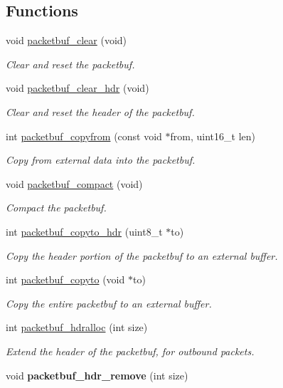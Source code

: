 \subsection*{Functions}
\begin{DoxyCompactItemize}
\item 
void \hyperlink{group__packetbuf_gaa540c9abf0db13d27881b616f7794824}{packetbuf\+\_\+clear} (void)
\begin{DoxyCompactList}\small\item\em Clear and reset the packetbuf. \end{DoxyCompactList}\item 
void \hyperlink{group__packetbuf_ga9ed85aa3405fa87ed8b1e523dd374dcd}{packetbuf\+\_\+clear\+\_\+hdr} (void)
\begin{DoxyCompactList}\small\item\em Clear and reset the header of the packetbuf. \end{DoxyCompactList}\item 
int \hyperlink{group__packetbuf_ga5fd9cb98f800733b6d9381bce81cd224}{packetbuf\+\_\+copyfrom} (const void $\ast$from, uint16\+\_\+t len)
\begin{DoxyCompactList}\small\item\em Copy from external data into the packetbuf. \end{DoxyCompactList}\item 
void \hyperlink{group__packetbuf_ga39a862c119717560e224923801c1fa2a}{packetbuf\+\_\+compact} (void)
\begin{DoxyCompactList}\small\item\em Compact the packetbuf. \end{DoxyCompactList}\item 
int \hyperlink{group__packetbuf_gac4b6f4ff134a21b6c2f726ca9342bb2f}{packetbuf\+\_\+copyto\+\_\+hdr} (uint8\+\_\+t $\ast$to)
\begin{DoxyCompactList}\small\item\em Copy the header portion of the packetbuf to an external buffer. \end{DoxyCompactList}\item 
int \hyperlink{group__packetbuf_gacad3b92ca8f9ce7845b6c490ba9f05bf}{packetbuf\+\_\+copyto} (void $\ast$to)
\begin{DoxyCompactList}\small\item\em Copy the entire packetbuf to an external buffer. \end{DoxyCompactList}\item 
int \hyperlink{group__packetbuf_gacffe7341cbfe90034e829ea70111203a}{packetbuf\+\_\+hdralloc} (int size)
\begin{DoxyCompactList}\small\item\em Extend the header of the packetbuf, for outbound packets. \end{DoxyCompactList}\item 
\hypertarget{group__packetbuf_ga4b2940aecccd22785e0160684c3a8327}{}void {\bfseries packetbuf\+\_\+hdr\+\_\+remove} (int size)\label{group__packetbuf_ga4b2940aecccd22785e0160684c3a8327}


\end{DoxyCompactItemize}
